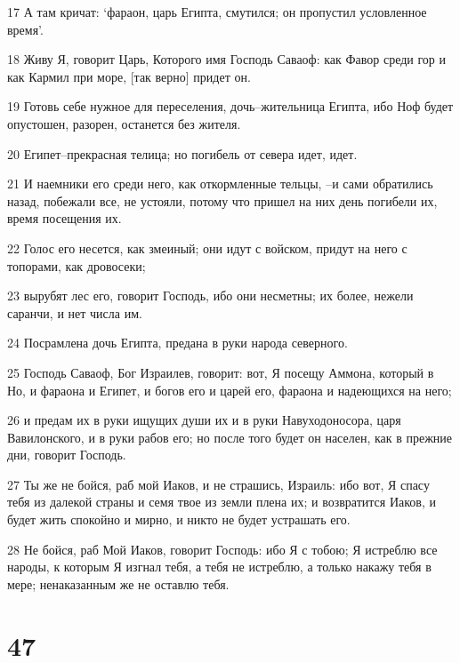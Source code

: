 \par 17 А там кричат: `фараон, царь Египта, смутился; он пропустил условленное время'.
\par 18 Живу Я, говорит Царь, Которого имя Господь Саваоф: как Фавор среди гор и как Кармил при море, [так верно] придет он.
\par 19 Готовь себе нужное для переселения, дочь--жительница Египта, ибо Ноф будет опустошен, разорен, останется без жителя.
\par 20 Египет--прекрасная телица; но погибель от севера идет, идет.
\par 21 И наемники его среди него, как откормленные тельцы, --и сами обратились назад, побежали все, не устояли, потому что пришел на них день погибели их, время посещения их.
\par 22 Голос его несется, как змеиный; они идут с войском, придут на него с топорами, как дровосеки;
\par 23 вырубят лес его, говорит Господь, ибо они несметны; их более, нежели саранчи, и нет числа им.
\par 24 Посрамлена дочь Египта, предана в руки народа северного.
\par 25 Господь Саваоф, Бог Израилев, говорит: вот, Я посещу Аммона, который в Но, и фараона и Египет, и богов его и царей его, фараона и надеющихся на него;
\par 26 и предам их в руки ищущих души их и в руки Навуходоносора, царя Вавилонского, и в руки рабов его; но после того будет он населен, как в прежние дни, говорит Господь.
\par 27 Ты же не бойся, раб мой Иаков, и не страшись, Израиль: ибо вот, Я спасу тебя из далекой страны и семя твое из земли плена их; и возвратится Иаков, и будет жить спокойно и мирно, и никто не будет устрашать его.
\par 28 Не бойся, раб Мой Иаков, говорит Господь: ибо Я с тобою; Я истреблю все народы, к которым Я изгнал тебя, а тебя не истреблю, а только накажу тебя в мере; ненаказанным же не оставлю тебя.

\chapter{47}

